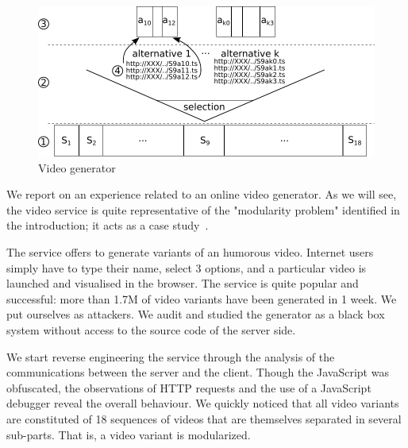 %

\begin{figure}
\centering
\includegraphics[width=0.6\linewidth]{figures/bref-generator.pdf}
\caption{\label{fig:generator}Video generator}
\end{figure}

We report on an experience related to an online video generator. %
As we will see, the video service is quite representative of the "modularity problem" identified in the introduction; it acts as a case study~\cite{yin2002}.

The service offers to generate variants of an humorous video. Internet users simply have to type their name, select 3 options, and a particular video is launched and visualised in the browser. %
The service is quite popular and successful: more than 1.7M of video variants have been generated in 1 week. 
 We put ourselves as attackers. We audit and studied the generator as a black box system without access to the source code of the server side. 

We start reverse engineering the service through the analysis of the communications between the server and the client. 
Though the JavaScript was obfuscated, the observations of HTTP requests and the use of a JavaScript debugger reveal the overall behaviour. We quickly noticed that all video variants are constituted of 18 sequences of videos that are themselves separated in several sub-parts. 
That is, a video variant is modularized. 


